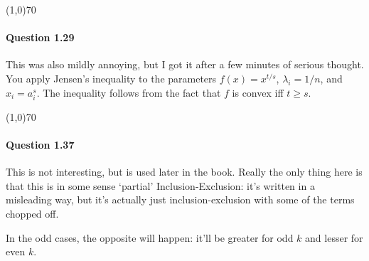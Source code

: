 \begin{center}
	\line(1,0){70}
\end{center}

\paragraph{Question 1.29} This was also mildly annoying, but I got it after a few minutes of serious thought. You apply Jensen's inequality to the parameters $f(x)=x^{t/s}$, $\lambda_i = 1/n$, and $x_i = a_i^{s}$. The inequality follows from the fact that $f$ is convex iff $t\geq s$.

\begin{center}
	\line(1,0){70}
\end{center}

\paragraph{Question 1.37} This is not interesting, but is used later in the book. Really the only thing here is that this is in some sense `partial' Inclusion-Exclusion: it's written in a misleading way, but it's actually just inclusion-exclusion with some of the terms chopped off.

In the odd cases, the opposite will happen: it'll be greater for odd $k$ and lesser for even $k$.

